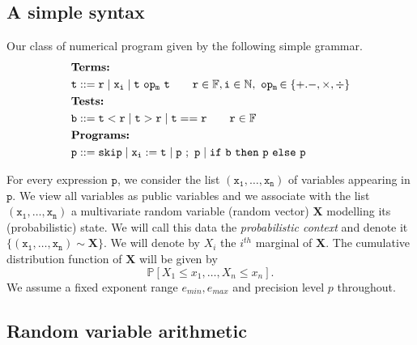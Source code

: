 \documentclass[10pt,conference]{IEEEtran}
\newcommand{\Pro}[1]{\mathbb{P}\left[ #1 \right]}
\newcommand{\F}{\mathbb{F}}
\newcommand{\N}{\mathbb{N}}
\newcommand{\mop}{~\mathtt{op_m}~}
\begin{document}
\subsection{A simple syntax}\label{subsec:syntax}

Our class of numerical program given by the following simple grammar.
\begin{align*}
&\textbf{Terms: }  
\\
& \tt t::= r \mid x_i \mid t\mop t \qquad \mathtt{r}\in\F, \mathtt{i}\in\N, \mop\hspace{-1ex}\in\{+.-,\times,\div\}
\\
&\textbf{Tests: } 
\\
& \tt b::= t < r \mid t > r \mid t == r  \qquad \mathtt{r}\in\F
\\
&\textbf{Programs:}
\\ 
&\tt p::= skip \mid \mathtt{x_i:=t}\mid \mathtt{p~;~p} \mid if~b~then~p~else~p
\end{align*}

For every expression $\mathtt{p}$, we consider the list $(\mathtt{x_1,\ldots,x_n})$ of variables appearing in $\mathtt{p}$. We view all variables as public variables and we associate with the list $(\mathtt{x_1,\ldots,x_n})$ a multivariate random variable (random vector) $\mathbf{X}$ modelling its (probabilistic) state. We will call this data the \emph{probabilistic context} and denote it $\{(\mathtt{x_1},\ldots,\mathtt{x_n})\sim\mathbf{X}\}$. We will denote by $X_i$ the $i^{th}$ marginal of $\mathbf{X}$. The cumulative distribution function of $\mathbf{X}$ will be given by
\[
\Pro{X_1\leq x_1,\ldots, X_n\leq x_n}.
\] 
We assume a fixed exponent range $e_{min}, e_{max}$ and precision level $p$ throughout.

\subsection{Random variable arithmetic}\label{subsec:rvarithmetic}
\end{document}
